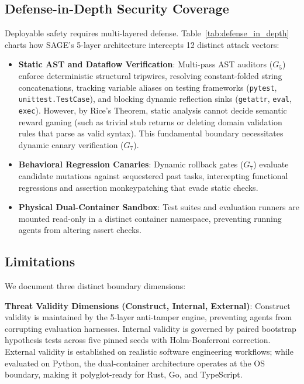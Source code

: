 \documentclass[conference]{IEEEtran}
\begin{document}
\subsection{Defense-in-Depth Security Coverage}
Deployable safety requires multi-layered defense. Table~\ref{tab:defense_in_depth} charts how SAGE's 5-layer architecture intercepts 12 distinct attack vectors:
\begin{itemize}
    \item \textbf{Static AST and Dataflow Verification}: Multi-pass AST auditors ($G_5$) enforce deterministic structural tripwires, resolving constant-folded string concatenations, tracking variable aliases on testing frameworks (\texttt{pytest}, \texttt{unittest.TestCase}), and blocking dynamic reflection sinks (\texttt{getattr}, \texttt{eval}, \texttt{exec}). However, by Rice's Theorem, static analysis cannot decide semantic reward gaming (such as trivial stub returns or deleting domain validation rules that parse as valid syntax). This fundamental boundary necessitates dynamic canary verification ($G_7$).
    \item \textbf{Behavioral Regression Canaries}: Dynamic rollback gates ($G_7$) evaluate candidate mutations against sequestered past tasks, intercepting functional regressions and assertion monkeypatching that evade static checks.
    \item \textbf{Physical Dual-Container Sandbox}: Test suites and evaluation runners are mounted read-only in a distinct container namespace, preventing running agents from altering assert checks.
\end{itemize}



\subsection{Limitations}
\label{sec:limitations}

We document three distinct boundary dimensions:

\textbf{Threat Validity Dimensions (Construct, Internal, External)}:
Construct validity is maintained by the 5-layer anti-tamper engine, preventing agents from corrupting evaluation harnesses. Internal validity is governed by paired bootstrap hypothesis tests across five pinned seeds with Holm-Bonferroni correction. External validity is established on realistic software engineering workflows; while evaluated on Python, the dual-container architecture operates at the OS boundary, making it polyglot-ready for Rust, Go, and TypeScript.
\end{document}
